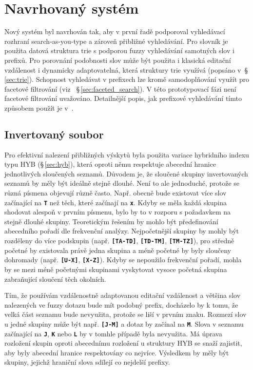 \documentclass[11pt,letterpaper,oneside,openright]{book}
\newcommand{\bftt}[1]{\texttt{\textbf{#1}}}
\begin{document}

\section{Navrhovaný systém}
Nový systém byl navrhován tak, aby v první řadě podporoval vyhledávací rozhraní
search-as-you-type a zároveň přibližné vyhledávání. Pro slovník je použita
datová struktura trie s podporou fuzzy vyhledávání samotných slov i prefixů.
Pro porovnání podobnosti slov může být použita i klasická editační vzdálenost i
dynamicky adaptovatelná, která struktury trie využívá (popsáno
v~\S\,\ref{sec:trie}). Schopnost vyhledávat v prefixech lze kromě
samodoplňování využít pro facetové filtrování (viz
~\S\,\ref{sec:faceted_search}). V této prototypovací fázi není facetové
filtrování uvažováno. Detailnější popis, jak prefixové vyhledávání tímto
způsobem použít je v~\cite{Bast_abstractwhen}.

\subsection{Invertovaný soubor}
Pro efektivní nalezení přibližných výskytů byla použita variace hybridního
indexu typu HYB (\S\,\ref{sec:hyb}), která oproti němu respektuje abecední
hranice jednotlivých sloučených seznamů. Důvodem je, že sloučené skupiny
invertovaných seznamů by měly být ideálně stejně dlouhé. Není to ale
jednoduché, protože se různá písmena objevují různě často. Např. obecně bude
existovat více slov začínající na \bftt{T} než těch, které začínají na
\bftt{x}. Kdyby se měla každá skupina shodovat alespoň v prvním písmenu, bylo
by to v rozporu s požadavkem na stejně dlouhé skupiny. Teoretickým řešením by
mohlo být předefinování abecedního pořadí dle frekvenční analýzy. Nejpočetnější
skupiny by mohly být rozděleny do více podskupin (např. \bftt{[TA-TD]},
\bftt{[TD-TM]}, \bftt{[TM-TZ]}), pro středně početné by existovala právě jedna
skupina a méně početné by byly sloučeny dohromady (např. \bftt{[U-X]},
\bftt{[X-Z]}). Kdyby se nepoužilo frekvenční pořadí, mohla by se mezi méně
početnými skupinami vyskytovat vysoce početná skupina zabraňující sloučení těch
okolních.

Tím, že používám vzdálenostně adaptovanou editační vzdálenost a většina slov
nalezených ve fuzzy dotazu bude mít podobný prefix, docházelo by k tomu, že
velká část seznamu bude nevyužita, protože se liší v prvním znaku. Rozmezí slov
u jedné skupiny může být např. \bftt{[J-M]} a dotaz by začínal na \bftt{M}. Slova v
seznamu začínající na \bftt{J}, \bftt{K} nebo \bftt{L} by v tomhle případě byla
nevyužita. Má úprava rozložení skupin oproti abecednímu rozložení u struktury
HYB se snaží zajistit, aby byly abecední hranice respektovány co nejvíce.
Výsledkem by měly být skupiny, jejichž hraniční slova sdílejí co nejdelší
prefixy.
\end{document}
